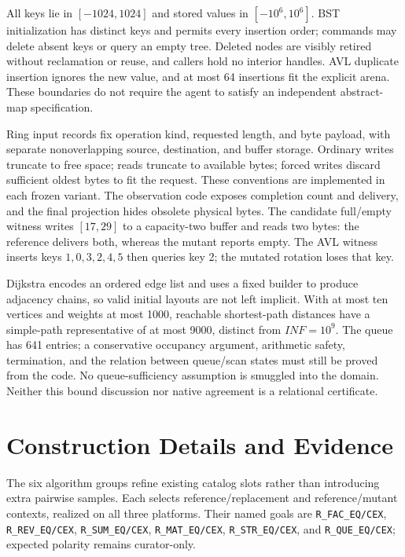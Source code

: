 \documentclass{article}
\begin{document}
All keys lie in $[-1024,1024]$ and stored values in $[-10^6,10^6]$. BST initialization has distinct keys and permits every insertion order; commands may delete absent keys or query an empty tree. Deleted nodes are visibly retired without reclamation or reuse, and callers hold no interior handles. AVL duplicate insertion ignores the new value, and at most 64 insertions fit the explicit arena. These boundaries do not require the agent to satisfy an independent abstract-map specification.

Ring input records fix operation kind, requested length, and byte payload, with separate nonoverlapping source, destination, and buffer storage. Ordinary writes truncate to free space; reads truncate to available bytes; forced writes discard sufficient oldest bytes to fit the request. These conventions are implemented in each frozen variant. The observation code exposes completion count and delivery, and the final projection hides obsolete physical bytes. The candidate full/empty witness writes $[17,29]$ to a capacity-two buffer and reads two bytes: the reference delivers both, whereas the mutant reports empty. The AVL witness inserts keys $1,0,3,2,4,5$ then queries key 2; the mutated rotation loses that key.

Dijkstra encodes an ordered edge list and uses a fixed builder to produce adjacency chains, so valid initial layouts are not left implicit. With at most ten vertices and weights at most 1000, reachable shortest-path distances have a simple-path representative of at most 9000, distinct from $\mathit{INF}=10^9$. The queue has 641 entries; a conservative occupancy argument, arithmetic safety, termination, and the relation between queue/scan states must still be proved from the code. No queue-sufficiency assumption is smuggled into the domain. Neither this bound discussion nor native agreement is a relational certificate.


\section{Construction Details and Evidence}
\label{app:construction}

The six algorithm groups refine existing catalog slots rather than introducing extra pairwise samples. Each selects reference/replacement and reference/mutant contexts, realized on all three platforms. Their named goals are \texttt{R\_FAC\_EQ/CEX}, \texttt{R\_REV\_EQ/CEX}, \texttt{R\_SUM\_EQ/CEX}, \texttt{R\_MAT\_EQ/CEX}, \texttt{R\_STR\_EQ/CEX}, and \texttt{R\_QUE\_EQ/CEX}; expected polarity remains curator-only.
\end{document}

